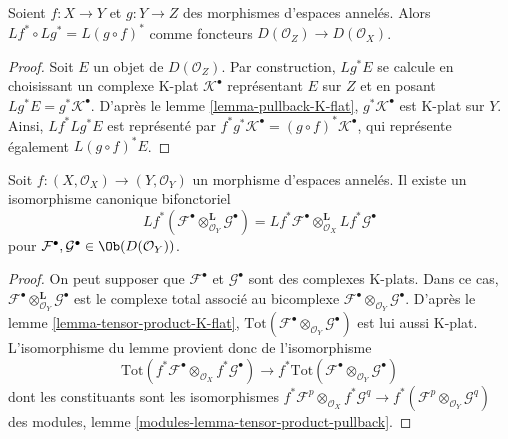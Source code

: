 {\begin{lemma}
\label{lemma-derived-pullback-composition}
Soient $f : X \to Y$ et $g : Y \to Z$ des morphismes d'espaces annelés. Alors $Lf^* \circ Lg^* = L(g \circ f)^*$ comme foncteurs $D(\mathcal{O}_Z) \to D(\mathcal{O}_X)$.
\end{lemma}

\begin{proof}
Soit $E$ un objet de $D(\mathcal{O}_Z)$. Par construction, $Lg^*E$ se calcule en choisissant un complexe K-plat $\mathcal{K}^\bullet$ représentant $E$ sur $Z$ et en posant $Lg^*E = g^*\mathcal{K}^\bullet$. D'après le lemme \ref{lemma-pullback-K-flat}, $g^*\mathcal{K}^\bullet$ est K-plat sur $Y$. Ainsi, $Lf^*Lg^*E$ est représenté par $f^*g^*\mathcal{K}^\bullet = (g \circ f)^*\mathcal{K}^\bullet$, qui représente également $L(g \circ f)^*E$.
\end{proof}

\begin{lemma}

\label{lemma-pullback-tensor-product}
Soit $f : (X, \mathcal{O}_X) \to (Y, \mathcal{O}_Y)$ un morphisme d'espaces annelés. Il existe un isomorphisme canonique bifonctoriel $$
Lf^*(
\mathcal{F}^\bullet \otimes_{\mathcal{O}_Y}^{\mathbf{L}} \mathcal{G}^\bullet
) =
Lf^*\mathcal{F}^\bullet 
\otimes_{\mathcal{O}_X}^{\mathbf{L}}
Lf^*\mathcal{G}^\bullet 
$$ pour $\mathcal{F}^\bullet, \mathcal{G}^\bullet \in \Ob(D(\mathcal{O}_Y))$.
\end{lemma}

\begin{proof}
On peut supposer que $\mathcal{F}^\bullet$ et $\mathcal{G}^\bullet$ sont des complexes K-plats. Dans ce cas, $\mathcal{F}^\bullet \otimes_{\mathcal{O}_Y}^{\mathbf{L}} \mathcal{G}^\bullet$ est le complexe total associé au bicomplexe $\mathcal{F}^\bullet \otimes_{\mathcal{O}_Y} \mathcal{G}^\bullet$. D'après le lemme \ref{lemma-tensor-product-K-flat}, $\text{Tot}(\mathcal{F}^\bullet \otimes_{\mathcal{O}_Y} \mathcal{G}^\bullet)$ est lui aussi K-plat. L'isomorphisme du lemme provient donc de l'isomorphisme $$
\text{Tot}(f^*\mathcal{F}^\bullet \otimes_{\mathcal{O}_X}
f^*\mathcal{G}^\bullet)
\longrightarrow
f^*\text{Tot}(\mathcal{F}^\bullet \otimes_{\mathcal{O}_Y} \mathcal{G}^\bullet)
$$ dont les constituants sont les isomorphismes $f^*\mathcal{F}^p \otimes_{\mathcal{O}_X} f^*\mathcal{G}^q \to
f^*(\mathcal{F}^p \otimes_{\mathcal{O}_Y} \mathcal{G}^q)$ des modules, lemme \ref{modules-lemma-tensor-product-pullback}.
\end{proof}

\begin{lemma}


\end{lemma}}
